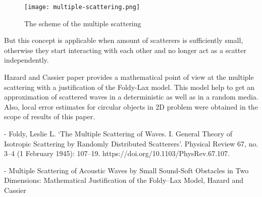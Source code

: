 \begin{figure}[H]
    \centering
    \texttt{[image: multiple-scattering.png]}
    \caption*{The scheme of the multiple scattering}
    \label{fig:multiple-scattering}
\end{figure}

But this concept is applicable when amount of scatterers is sufficiently small, otherwise they start interacting with each other and no longer act as a scatter independently. %

Hazard and Cassier paper provides a mathematical point of view at the multiple scattering with a justification of the Foldy-Lax model. This model help to get an approximation of scattered waves in a deterministic as well as in a random media. Also, local error estimates for circular objects in 2D problem were obtained in the scope of results of this paper.

- Foldy, Leslie L. ‘The Multiple Scattering of Waves. I. General Theory of Isotropic Scattering by Randomly Distributed Scatterers’. Physical Review 67, no. 3–4 (1 February 1945): 107–19. https://doi.org/10.1103/PhysRev.67.107.

- Multiple Scattering of Acoustic Waves by Small Sound-Soft Obstacles in Two Dimensions: Mathematical Justification of the Foldy–Lax Model, Hazard and Cassier